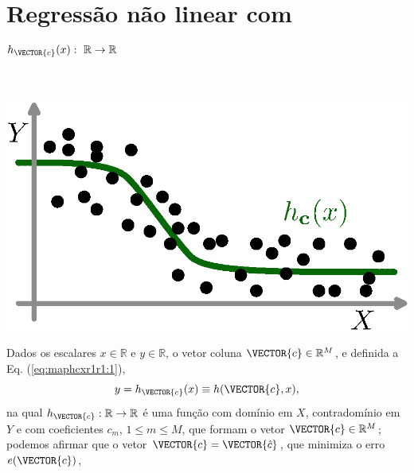 \section{Regressão não linear com $h_{\VECTOR{c}}(x):~\mathbb{R} \rightarrow \mathbb{R}$ }
\label{sec:theo:maphcxr1r1}



\begin{theorem}
\label{theo:maphcxr1r1}
~\\
\begin{minipage}{0.4\textwidth}
\centering
\includegraphics[width=0.95\linewidth]{chapters/mapeamento/mapeamento-hx-nonlinear.eps} 
\end{minipage}
\begin{minipage}{0.6\textwidth}
Dados
os escalares $x \in \mathbb{R}$ e $y \in \mathbb{R}$, o vetor coluna $\VECTOR{c} \in \mathbb{R}^M$, e 
definida a Eq. (\ref{eq:maphcxr1r1:1}), 
\begin{equation}\label{eq:maphcxr1r1:1}
y=h_{\VECTOR{c}}(x)\equiv h(\VECTOR{c},x),
\end{equation}
na qual $h_{\VECTOR{c}}:\mathbb{R} \rightarrow \mathbb{R}$ é uma função com domínio em $X$, contradomínio em $Y$
e com coeficientes $c_m$, $1 \leq m \leq M$, que formam o vetor $\VECTOR{c} \in \mathbb{R}^{M}$;
podemos afirmar que o vetor $\VECTOR{c}=\VECTOR{\hat{c}}$,
que minimiza o erro $e(\VECTOR{c})$,
\end{minipage}


\end{theorem}
